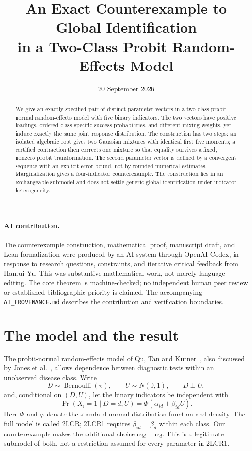 \documentclass[11pt,a4paper]{article}
\title{An Exact Counterexample to Global Identification\\
in a Two-Class Probit Random-Effects Model}
\author{}
\date{20 September 2026}
\numberwithin{equation}{section}
\newcommand{\ph}{\varphi}
\begin{document}
\maketitle
\begin{abstract}
We give an exactly specified pair of distinct parameter vectors in a two-class probit-normal random-effects model with five binary indicators. The two vectors have positive loadings, ordered class-specific success probabilities, and different mixing weights, yet induce exactly the same joint response distribution. The construction has two steps: an isolated algebraic root gives two Gaussian mixtures with identical first five moments; a certified contraction then corrects one mixture so that equality survives a fixed, nonzero probit transformation. The second parameter vector is defined by a convergent sequence with an explicit error bound, not by rounded numerical estimates. Marginalization gives a four-indicator counterexample. The construction lies in an exchangeable submodel and does not settle generic global identification under indicator heterogeneity.
\end{abstract}

\paragraph{AI contribution.}
The counterexample construction, mathematical proof, manuscript draft, and Lean formalization were produced by an AI system through OpenAI Codex, in response to research questions, constraints, and iterative critical feedback from Hanrui Yu. This was substantive mathematical work, not merely language editing. The core theorem is machine-checked; no independent human peer review or established bibliographic priority is claimed. The accompanying \texttt{AI\_PROVENANCE.md} describes the contribution and verification boundaries.

\section{The model and the result}
The probit-normal random-effects model of Qu, Tan and Kutner~\cite{qu}, also discussed by Jones et al.~\cite{jones}, allows dependence between diagnostic tests within an unobserved disease class. Write
\[
 D\sim\operatorname{Bernoulli}(\pi),\qquad U\sim N(0,1),\qquad D\perp U,
\]
and, conditional on $(D,U)$, let the binary indicators be independent with
\begin{equation}\label{eq:model}
 \Pr(X_i=1\mid D=d,U)=\Phi(\alpha_{id}+\beta_{id}U).
\end{equation}
Here $\Phi$ and $\ph$ denote the standard-normal distribution function and density. The full model is called 2LCR; 2LCR1 requires $\beta_{id}=\beta_d$ within each class. Our counterexample makes the additional choice $\alpha_{id}=\alpha_d$. This is a legitimate submodel of both, not a restriction assumed for every parameter in 2LCR1.
\end{document}
